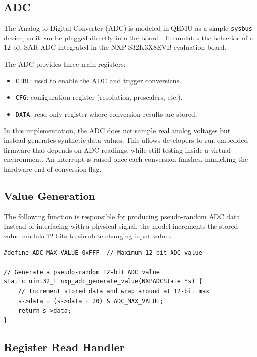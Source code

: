 \documentclass{article}
\begin{document}
\subsection{ADC}




The Analog-to-Digital Converter (ADC) is modeled in QEMU as a simple
\texttt{sysbus} device, so it can be plugged directly into the board . It emulates the behavior of a 12-bit SAR ADC
integrated in the NXP S32K3X8EVB evaluation board.  

The ADC provides three main registers:
\begin{itemize}
    \item \texttt{CTRL}: used to enable the ADC and trigger conversions.
    \item \texttt{CFG}: configuration register (resolution, prescalers, etc.).
    \item \texttt{DATA}: read-only register where conversion results are stored.
\end{itemize}

In this implementation, the ADC does not sample real analog voltages but instead
generates synthetic data values. This allows developers to run embedded firmware
that depends on ADC readings, while still testing inside a virtual environment.
An interrupt is raised once each conversion finishes, mimicking the hardware
end-of-conversion flag.

\subsection{Value Generation}

The following function is responsible for producing pseudo-random ADC data.
Instead of interfacing with a physical signal, the model increments the
stored value modulo 12 bits to simulate changing input values.

\begin{verbatim}
#define ADC_MAX_VALUE 0xFFF  // Maximum 12-bit ADC value

// Generate a pseudo-random 12-bit ADC value
static uint32_t nxp_adc_generate_value(NXPADCState *s) {
    // Increment stored data and wrap around at 12-bit max
    s->data = (s->data + 20) & ADC_MAX_VALUE;
    return s->data;
}
\end{verbatim}

\subsection{Register Read Handler}
\end{document}
